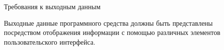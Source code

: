 \subsubsection{} Требования к выходным данным
\label{sec:analysis:research:req:outputs}

Выходные данные программного средства должны быть представлены посредством отображения информации с помощью различных элементов пользовательского интерфейса.